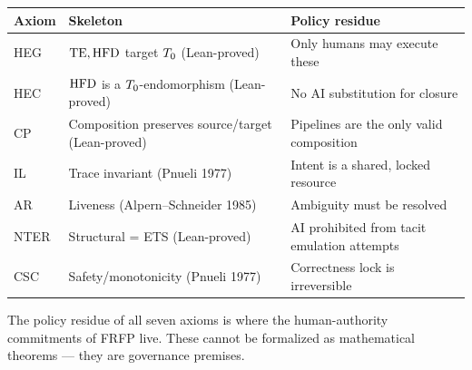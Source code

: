 \begin{center}
\begin{tabular}{p{1cm}p{5.5cm}p{5.5cm}}
\toprule
Axiom & Skeleton & Policy residue \\
\midrule
HEG  & $\mathrm{TE}, \mathrm{HFD}$ target $T_0$ (Lean-proved) & Only humans may execute these \\
HEC  & $\mathrm{HFD}$ is a $T_0$-endomorphism (Lean-proved) & No AI substitution for closure \\
CP   & Composition preserves source/target (Lean-proved) & Pipelines are the only valid composition \\
IL   & Trace invariant (Pnueli 1977) & Intent is a shared, locked resource \\
AR   & Liveness (Alpern--Schneider 1985) & Ambiguity must be resolved \\
NTER & Structural = ETS (Lean-proved) & AI prohibited from tacit emulation attempts \\
CSC  & Safety/monotonicity (Pnueli 1977) & Correctness lock is irreversible \\
\bottomrule
\end{tabular}
\end{center}

The policy residue of all seven axioms is where the human-authority commitments
of FRFP live. These cannot be formalized as mathematical theorems --- they are
governance premises.

